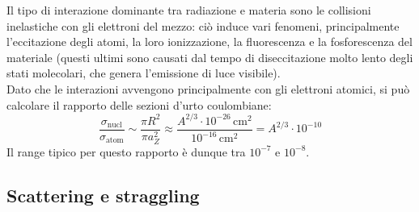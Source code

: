 Il tipo di interazione dominante tra radiazione e materia sono le collisioni inelastiche con gli elettroni del mezzo: ciò induce vari fenomeni, principalmente l'eccitazione degli atomi, la loro ionizzazione, la fluorescenza e la fosforescenza del materiale (questi ultimi sono causati dal tempo di diseccitazione molto lento degli stati molecolari, che genera l'emissione di luce visibile).\\
Dato che le interazioni avvengono principalmente con gli elettroni atomici, si può calcolare il rapporto delle sezioni d'urto coulombiane:
\begin{equation}
	\frac{\sigma_{\text{nucl}}}{\sigma_{\text{atom}}} \sim \frac{\pi R^2}{\pi a_Z^2} \approx \frac{A^{2/3} \cdot 10^{-26} \,\text{cm}^2}{10^{-16} \,\text{cm}^2} = A^{2/3} \cdot 10^{-10}
	\label{eq:3.1}
\end{equation}
Il range tipico per questo rapporto è dunque tra $ 10^{-7} $ e $ 10^{-8} $.

\subsection{Scattering e straggling}

